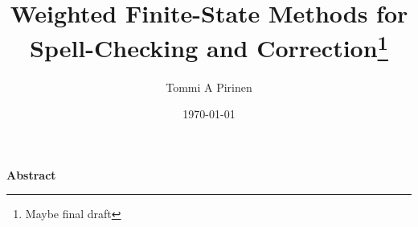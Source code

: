 \documentclass[a4paper]{book}
\title{Weighted Finite-State Methods for 
Spell-Checking
and Correction\footnote{Maybe final draft}}
\author{Tommi A Pirinen}
\date{\today}
\begin{document}
\maketitle

\thispagestyle{plain}
{\raggedright\setlength{\parindent}{0pt}\setlength{\parskip}{0pt}
\textbf{Abstract}\par
    
}
\end{document}
